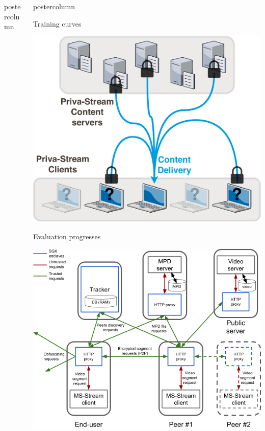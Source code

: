 \begin{frame}
\begin{columns}
\begin{column}{.49\textwidth}
\begin{beamercolorbox}[center,wd=\textwidth]{postercolumn}
\begin{minipage}[T]{.95\textwidth}
{          }
        \end{minipage}
      \end{beamercolorbox}
    \end{column}
    \begin{column}{.49\textwidth}
      \begin{beamercolorbox}[center,wd=\textwidth]{postercolumn}
        \begin{minipage}[T]{.95\textwidth}
          \parbox[t][\columnheight]{\textwidth}{
            
            \begin{block}{Training curves}
            
            \centering
            
            \includegraphics[width=.925\textwidth]{sample/BP.pdf}
            
            \end{block}
            
            \vfill
            
            \begin{block}{Evaluation progresses}
            
            \centering
            
            \includegraphics[width=.8\textwidth]{sample/PS-tech.png}
            

\end{block}}
\end{minipage}
\end{beamercolorbox}
\end{column}
\end{columns}
\end{frame}
